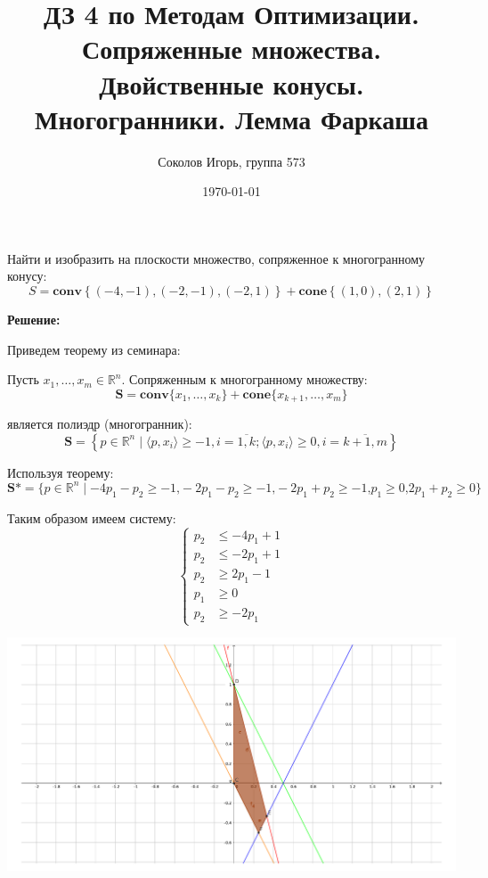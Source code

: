 \documentclass[a4paper,12pt]{article}
\author{Соколов Игорь, группа 573}
\title{ДЗ 4 по Методам Оптимизации. \newline Сопряженные множества. Двойственные конусы. Многогранники. Лемма Фаркаша}
\date{\today}
\begin{document}

\maketitle

\section{}

Найти и изобразить на плоскости множество, сопряженное к многогранному конусу: $$ S = \mathbf{conv} \left\{ (-4,-1), (-2,-1), (-2,1)\right\} + \mathbf{cone} \left\{ (1,0), (2,1)\right\} $$

\vspace{\baselineskip}

\textbf{Решение:}

Приведем теорему из семинара:

Пусть $x_1,\ldots,x_m \in\mathbb{R}^n$. Сопряженным к многогранному множеству:
 $$ \textbf{S} = \mathbf{conv}\{x_1, \ldots, x_k\} + \mathbf{cone}\{x_{k+1}, \ldots, x_m \}$$
 
является полиэдр (многогранник):
\[\textbf{S} = \left\{p \in \mathbb{R}^n \mid \langle{ p, x_i }\rangle \ge -1, i = \overline{1, k}; \langle{ p, x_i }\rangle \ge 0 , i =\overline{k+1, m} \right\} \]

Используя теорему:
\[\textbf{S*} = \{p \in \mathbb{R}^n \mid -4p_1 - p_2 \ge -1\textbf{,} - 2p_1 -p_2 \ge -1\textbf{,} -2p_1 + p_2 \ge -1 \textbf{,} p_1 \ge 0 \textbf{,} 2p_1 + p_2 \ge 0\}\]

Таким образом имеем систему:
\[
\left\{
\begin{aligned}
p_2 &\leq -4p_1 + 1  \\
p_2 &\leq -2p_1 + 1\\
p_2 &\ge 2p_1 - 1\\
p_1 &\ge 0  \\
p_2 &\ge -2p_1
\end{aligned}
\right.
\]

\includegraphics[width=\textwidth]{image_problem1.pdf}
\end{document}
